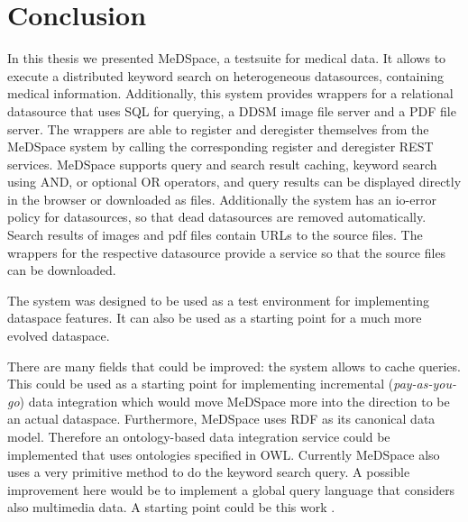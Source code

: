 \chapter{Conclusion}

In this thesis we presented MeDSpace, a testsuite for medical data. It allows to execute a distributed keyword search on heterogeneous datasources, containing medical information. 
Additionally, this system provides wrappers for a relational datasource that uses SQL for querying, a DDSM image file server and a PDF file server. The wrappers are able to register and deregister themselves from the MeDSpace system by calling the corresponding register and deregister REST services. MeDSpace supports query and search result caching, keyword search using AND, or optional OR operators, and query results can be displayed directly in the browser or downloaded as files. Additionally the system has an io-error policy for datasources, so that dead datasources are removed automatically. Search results of images and pdf files contain URLs to the source files. The wrappers for the respective datasource provide a service so that the source files can be downloaded.

The system was designed to be used as a test environment for implementing dataspace features. It can also be used as a starting point for a much more evolved dataspace.

There are many fields that could be improved: the system allows to cache queries. This could be used as a starting point for implementing incremental (\emph{pay-as-you-go}) data integration which would move MeDSpace more into the direction to be an actual dataspace. Furthermore, MeDSpace uses RDF as its canonical data model. Therefore an ontology-based data integration service could be implemented that uses ontologies specified in OWL. 
Currently MeDSpace also uses  a very primitive method to do the keyword search query.
A possible improvement here would be to implement a global query language that considers also multimedia data. A starting point could be this work \cite{6214725}.